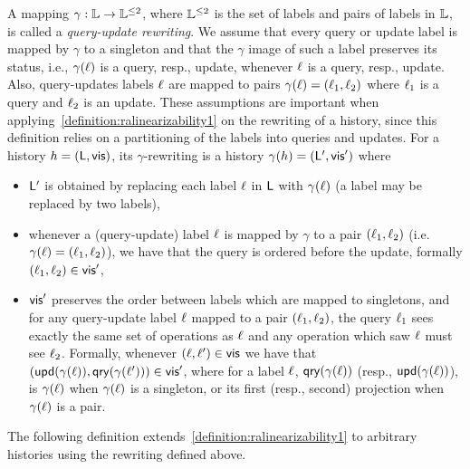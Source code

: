 A mapping $\gamma:\mathbb{L}\rightarrow \mathbb{L}^{\leq 2}$, where $\mathbb{L}^{\leq 2}$ is the set of labels and pairs of labels in $\mathbb{L}$, is called a \emph{query-update rewriting}.
We assume that every query or update label is mapped by $\gamma$ to a singleton and that the $\gamma$ image of such a label preserves its status, i.e., $\gamma(\ell)$ is a query, resp., update, whenever $\ell$ is a query, resp., update. Also, query-updates labels $\ell$ are mapped to pairs $\gamma(\ell)=(\ell_1,\ell_2)$ where $\ell_1$ is a query and $\ell_2$ is an update. These assumptions are important when applying~\autoref{definition:ralinearizability1} on the rewriting of a history, since this definition relies on a partitioning of the labels into queries and updates.
For a history $h=(\mathsf{L},\mathsf{vis})$, its $\gamma$-rewriting is a
history $\gamma(h)=(\mathsf{L}',\mathsf{vis}')$ where
\begin{itemize}
\item $\mathsf{L}'$ is obtained by replacing each label $\ell$ in
  $\mathsf{L}$ with $\gamma(\ell)$ (a label may be replaced by two
  labels),
\item whenever a (query-update) label $\ell$ is mapped by $\gamma$
  to a pair $(\ell_1,\ell_2)$ (i.e.
  $\gamma(\ell)=(\ell_1,\ell_2)$), we have that the query is
  ordered before the update, formally $(\ell_1,\ell_2)\in \mathsf{vis}'$,
\item $\mathsf{vis}'$ preserves the order between labels which are
  mapped to singletons, and
  for any query-update label $\ell$ mapped to a pair
 $(\ell_1,\ell_2)$, the query $\ell_1$ sees exactly the same
 set of operations as $\ell$ and any operation which saw $\ell$
 must see $\ell_2$.
 Formally, whenever $(\ell,\ell')\in\mathsf{vis}$ we have that
 $(\mathsf{upd}(\gamma(\ell)),
 \mathsf{qry}(\gamma(\ell')))\in\mathsf{vis}'$, where for a label $\ell$,
 $\mathsf{qry}(\gamma(\ell))$ (resp., $\mathsf{upd}(\gamma(\ell))$), is
 $\gamma(\ell)$ when $\gamma(\ell)$ is a singleton, or its first (resp.,
 second) projection when $\gamma(\ell)$ is a pair.
\end{itemize}
The following definition
extends~\autoref{definition:ralinearizability1} to arbitrary histories
using the rewriting defined above.

